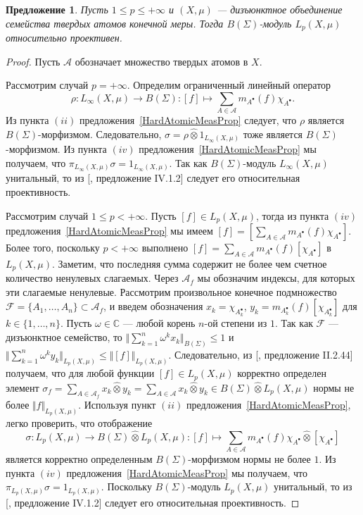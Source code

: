 \documentclass[12pt]{article}
\newtheorem{proposition}[theorem]{Предложение}
\newcommand{\projtens}{\mathbin{\widehat{\otimes}}}
\begin{document}
\begin{proposition}\label{LpBSigmaModSuffCond} Пусть $1\leq p\leq +\infty$ и
    $(X,\mu)$ --- дизъюнктное объединение семейства твердых атомов конечной
    меры. Тогда $B(\Sigma)$-модуль $L_p(X,\mu)$ относительно проективен.
\end{proposition}
\begin{proof} Пусть $\mathcal{A}$ обозначает множество твердых атомов в $X$.

    Рассмотрим случай $p=+\infty$. Определим ограниченный линейный оператор
    $$
        \rho:L_\infty(X,\mu)\to B(\Sigma):
        [f]\mapsto\sum_{A\in\mathcal{A}}m_{A^\bullet}(f)\chi_{A^\bullet}.
    $$
    Из пункта $(ii)$ предложения~\ref{HardAtomicMeasProp} следует, что $\rho$
    является $B(\Sigma)$-морфизмом. Следовательно, $\sigma=\rho\projtens
        1_{L_\infty(X,\mu)}$ тоже является $B(\Sigma)$-морфизмом. Из пункта $(iv)$
    предложения~\ref{HardAtomicMeasProp} мы получаем, что
    $\pi_{L_\infty(X,\mu)}\sigma=1_{L_\infty(X,\mu)}$. Так как
    $B(\Sigma)$-модуль $L_\infty(X,\mu)$ унитальный, то из
    [\cite{HelHomolBanTopAlg}, предложение IV.1.2] следует его относительная
    проективность.

    Рассмотрим случай $1\leq p<+\infty$. Пусть $[f]\in L_p(X,\mu)$, тогда из
    пункта $(iv)$ предложения~\ref{HardAtomicMeasProp} мы имеем
    $[f]=[\sum_{A\in\mathcal{A}}m_{A^\bullet}(f)\chi_{A^\bullet}]$. Более того,
    поскольку $p<+\infty$ выполнено
    $[f]=\sum_{A\in\mathcal{A}}m_{A^\bullet}(f)[\chi_{A^\bullet}]$ в
    $L_p(X,\mu)$. Заметим, что последняя сумма содержит не более чем счетное
    количество ненулевых слагаемых. Через $\mathcal{A}_f$ мы обозначим индексы,
    для которых эти слагаемые ненулевые. Рассмотрим произвольное конечное
    подмножество $\mathcal{F}=\{A_1,\ldots,A_n\}\subset\mathcal{A}_f$, и введем
    обозначения $x_k=\chi_{A_k^\bullet}$,
    $y_k=m_{A_k^\bullet}(f)[\chi_{A_k^\bullet}]$ для $k\in \{1,\ldots,n\}$.
    Пусть $\omega\in\mathbb{C}$ --- любой корень $n$-ой степени из $1$. Так как
    $\mathcal{F}$ --- дизъюнктное семейство, то $\Vert\sum_{k=1}^n \omega^k
        x_k\Vert_{B(\Sigma)}\leq 1$ и $\Vert \sum_{k=1}^n\omega^k
        y_k\Vert_{L_p(X,\mu)}\leq\Vert [f]\Vert_{L_p(X,\mu)}$. Следовательно, из
    [\cite{HelHomolBanTopAlg}, предложение II.2.44] получаем, что для любой
    функции $[f]\in L_p(X,\mu)$ корректно определен элемент
    $\sigma_f=\sum_{A\in\mathcal{A}_f} x_k\projtens y_k=\sum_{A\in\mathcal{A}}
        x_k\projtens y_k\in B(\Sigma)\projtens L_p(X,\mu)$ нормы не более $\Vert
        f\Vert_{L_p(X,\mu)}$. Используя пункт $(ii)$
    предложения~\ref{HardAtomicMeasProp}, легко проверить, что отображение
    $$
        \sigma: L_p(X,\mu)\to B(\Sigma)\projtens L_p(X,\mu):
        [f]\mapsto \sum_{A\in\mathcal{A}}
        m_{A^\bullet}(f)\chi_{A^\bullet}\projtens[\chi_{A^\bullet}]
    $$
    является корректно определенным $B(\Sigma)$-морфизмом нормы не более $1$. Из
    пункта $(iv)$ предложения~\ref{HardAtomicMeasProp} мы получаем, что
    $\pi_{L_p(X,\mu)}\sigma=1_{L_p(X,\mu)}$. Поскольку $B(\Sigma)$-модуль
    $L_p(X,\mu)$ унитальный, то из [\cite{HelHomolBanTopAlg}, предложение
    IV.1.2] следует его относительная проективность.
\end{proof}
\end{document}
